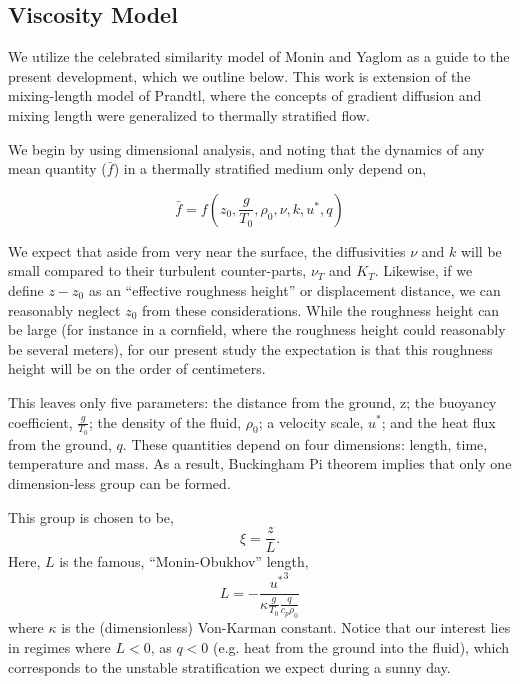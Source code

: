 \subsection{Viscosity Model}

We utilize the celebrated similarity model of Monin and Yaglom\cite{} as
a guide to the present development, which we outline below. This work is
extension of the mixing-length model of Prandtl, where the concepts of
gradient diffusion and mixing length were generalized to thermally
stratified flow.  

We begin by using dimensional analysis, and noting that the dynamics of
any mean quantity ($\bar f$) in a thermally stratified medium only depend on,

\begin{equation}
\bar f = f(z_0,\frac{g}{T_0},\rho_0,\nu,k,u^*,q)
\end{equation}

We expect that aside from very near the surface, the diffusivities $\nu$
and $k$ will be small compared to their turbulent counter-parts, $\nu_T$
and $K_T$. Likewise, if we define $z-z_0$ as an ``effective roughness
height'' or displacement distance, we can reasonably neglect $z_0$ from these
considerations. While the roughness height can be large (for instance in
a cornfield, where the roughness height could reasonably be several
meters), for our present study the expectation is that this roughness
height will be on the order of centimeters\cite{}. 

This leaves only five parameters: the distance from the ground, z; the
buoyancy coefficient, $\frac{g}{T_0}$; the density of the fluid,
$\rho_0$; a velocity scale, $u^*$; and the heat flux from the ground,
$q$. 
%
% 
These quantities depend on
four dimensions: length, time, temperature and mass. As a result,
Buckingham Pi theorem implies that only one dimension-less group can be
formed\cite{}.%

This group is chosen to be,
\begin{equation}
 \xi = \frac{z}{L}.
\end{equation}
Here, $L$ is the famous, ``Monin-Obukhov'' length,
\begin{equation}
 L = -\frac{{u^*}^3}{\kappa \frac{g}{T_0} \frac{q}{c_p \rho_0}}
\end{equation}
where $\kappa$ is the (dimensionless) Von-Karman constant. Notice that
our interest lies in regimes where $L<0$, as $q<0$ (e.g. heat from the
ground into the fluid), which corresponds to the unstable stratification 
we expect during a sunny day. 

